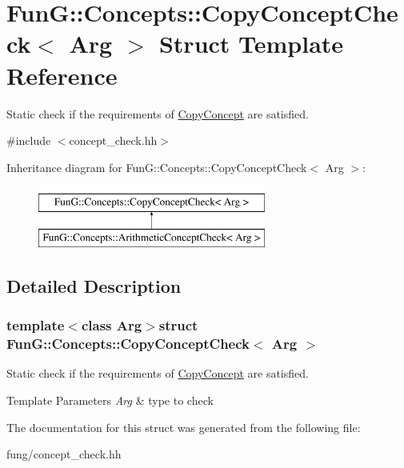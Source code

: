 \hypertarget{structFunG_1_1Concepts_1_1CopyConceptCheck}{\section{Fun\-G\-:\-:Concepts\-:\-:Copy\-Concept\-Check$<$ Arg $>$ Struct Template Reference}
\label{structFunG_1_1Concepts_1_1CopyConceptCheck}
}


Static check if the requirements of \hyperlink{structFunG_1_1Concepts_1_1CopyConcept}{Copy\-Concept} are satisfied.  




{\ttfamily \#include $<$concept\-\_\-check.\-hh$>$}

Inheritance diagram for Fun\-G\-:\-:Concepts\-:\-:Copy\-Concept\-Check$<$ Arg $>$\-:\begin{figure}[H]
\begin{center}
\leavevmode
\includegraphics[height=2.000000cm]{structFunG_1_1Concepts_1_1CopyConceptCheck}
\end{center}
\end{figure}


\subsection{Detailed Description}
\subsubsection*{template$<$class Arg$>$struct Fun\-G\-::\-Concepts\-::\-Copy\-Concept\-Check$<$ Arg $>$}

Static check if the requirements of \hyperlink{structFunG_1_1Concepts_1_1CopyConcept}{Copy\-Concept} are satisfied. 


\begin{DoxyTemplParams}{Template Parameters}
{\em Arg} & type to check \\
\hline
\end{DoxyTemplParams}


The documentation for this struct was generated from the following file\-:\begin{DoxyCompactItemize}
\item 
fung/concept\-\_\-check.\-hh\end{DoxyCompactItemize}
